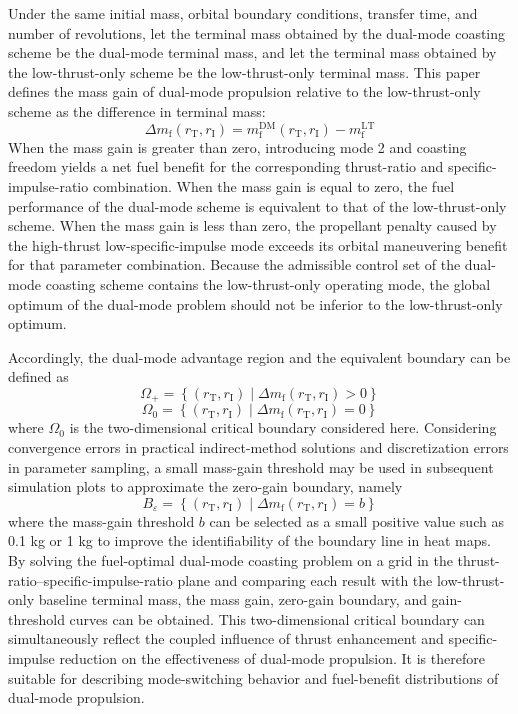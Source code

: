 ﻿\documentclass{IEEEtaes}
\begin{document}
Under the same initial mass, orbital boundary conditions, transfer time, and number of revolutions, let the terminal mass obtained by the dual-mode coasting scheme be the dual-mode terminal mass, and let the terminal mass obtained by the low-thrust-only scheme be the low-thrust-only terminal mass. This paper defines the mass gain of dual-mode propulsion relative to the low-thrust-only scheme as the difference in terminal mass:
\begin{equation}
\Delta m_{\mathrm{f}}(r_{\mathrm{T}},r_{\mathrm{I}})=m_{\mathrm{f}}^{\mathrm{DM}}(r_{\mathrm{T}},r_{\mathrm{I}})-m_{\mathrm{f}}^{\mathrm{LT}}
\end{equation}
When the mass gain is greater than zero, introducing mode 2 and coasting freedom yields a net fuel benefit for the corresponding thrust-ratio and specific-impulse-ratio combination. When the mass gain is equal to zero, the fuel performance of the dual-mode scheme is equivalent to that of the low-thrust-only scheme. When the mass gain is less than zero, the propellant penalty caused by the high-thrust low-specific-impulse mode exceeds its orbital maneuvering benefit for that parameter combination. Because the admissible control set of the dual-mode coasting scheme contains the low-thrust-only operating mode, the global optimum of the dual-mode problem should not be inferior to the low-thrust-only optimum.

Accordingly, the dual-mode advantage region and the equivalent boundary can be defined as
\begin{equation}
\Omega_{+}=\left\{(r_{\mathrm{T}},r_{\mathrm{I}})\mid \Delta m_{\mathrm{f}}(r_{\mathrm{T}},r_{\mathrm{I}})>0\right\}
\end{equation}
\begin{equation}
\Omega_{0}=\left\{(r_{\mathrm{T}},r_{\mathrm{I}})\mid \Delta m_{\mathrm{f}}(r_{\mathrm{T}},r_{\mathrm{I}})=0\right\}
\end{equation}
where $\Omega_{0}$ is the two-dimensional critical boundary considered here. Considering convergence errors in practical indirect-method solutions and discretization errors in parameter sampling, a small mass-gain threshold may be used in subsequent simulation plots to approximate the zero-gain boundary, namely
\begin{equation}
B_{\varepsilon}=\left\{(r_{\mathrm{T}},r_{\mathrm{I}})\mid \Delta m_{\mathrm{f}}(r_{\mathrm{T}},r_{\mathrm{I}})=b\right\}
\end{equation}
where the mass-gain threshold $b$ can be selected as a small positive value such as 0.1 kg or 1 kg to improve the identifiability of the boundary line in heat maps. By solving the fuel-optimal dual-mode coasting problem on a grid in the thrust-ratio--specific-impulse-ratio plane and comparing each result with the low-thrust-only baseline terminal mass, the mass gain, zero-gain boundary, and gain-threshold curves can be obtained. This two-dimensional critical boundary can simultaneously reflect the coupled influence of thrust enhancement and specific-impulse reduction on the effectiveness of dual-mode propulsion. It is therefore suitable for describing mode-switching behavior and fuel-benefit distributions of dual-mode propulsion.
\end{document}
